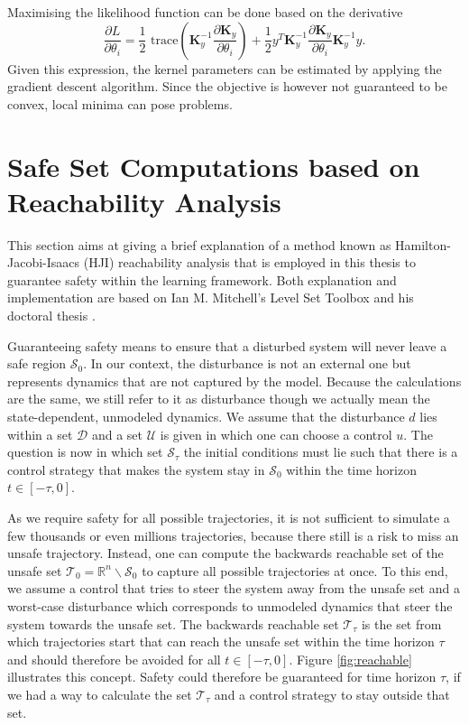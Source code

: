 \documentclass[../main.tex]{subfiles}
\begin{document}
Maximising the likelihood function can be done based on the derivative
\begin{equation}
    \frac{\partial L}{\partial \theta_i} = \dfrac{1}{2} \text{ trace} \left( \mathbf{K}_y^{-1} \frac{\partial \mathbf{K}_y}{\partial \theta_i} \right) + \frac{1}{2}y^T\mathbf{K}_y^{-1} \frac{\partial \mathbf{K}_y}{\partial \theta_i} \mathbf{K}_y^{-1} y.
\end{equation}
Given this expression, the kernel parameters can be estimated by applying the gradient descent algorithm. Since the objective is however not guaranteed to be convex, local minima can pose problems.


\section{Safe Set Computations based on Reachability Analysis}\label{sec:SafeSets}
This section aims at giving a brief explanation of a method known as Hamilton-Jacobi-Isaacs (HJI) reachability analysis that is employed in this thesis to guarantee safety within the learning framework. Both explanation and implementation are based on Ian M. Mitchell's Level Set Toolbox \cite{mitchell2004toolbox} and his doctoral thesis \cite{mitchell2003application}.

Guaranteeing safety means to ensure that a disturbed system will never leave a safe region $\mathcal{S}_0$. In our context, the disturbance is not an external one but represents dynamics that are not captured by the model. Because the calculations are the same, we still refer to it as disturbance though we actually mean the state-dependent, unmodeled dynamics. We assume that the disturbance $d$ lies within a set $\mathcal{D}$ and a set $\mathcal{U}$ is given in which one can choose a control $u$. The question is now in which set $\mathcal{S}_\tau$ the initial conditions must lie such that there is a control strategy that makes the system stay in $\mathcal{S}_0$ within the time horizon $t \in [-\tau,0]$. 

As we require safety for all possible trajectories, it is not sufficient to simulate a few thousands or even millions trajectories, because there still is a risk to miss an unsafe trajectory. Instead, one can compute the backwards reachable set of the unsafe set $\mathcal{T}_0 = \mathbb{R}^n\backslash \mathcal{S}_0$ to capture all possible trajectories at once. To this end, we assume a control that tries to steer the system away from the unsafe set and a worst-case disturbance which corresponds to unmodeled dynamics that steer the system towards the unsafe set. The backwards reachable set $\mathcal{T}_\tau$ is the set from which trajectories start that can reach the unsafe set within the time horizon $\tau$ and should therefore be avoided for all $t \in [-\tau,0]$. Figure \ref{fig:reachable} illustrates this concept. Safety could therefore be guaranteed for time horizon $\tau$, if we had a way to calculate the set $\mathcal{T}_\tau$ and a control strategy to stay outside that set. 
\end{document}
